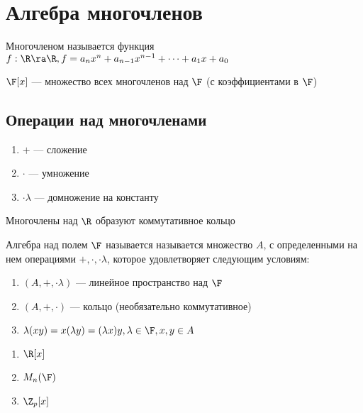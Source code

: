 
\section{Алгебра многочленов}

\begin{definition}
    Многочленом называется функция \(f: \R \ra \R, f = a_nx^n + a_{n-1}x^{n-1} + \dots + a_1x + a_0\)
\end{definition}

\begin{definition}
    \(\F[x]\) --- множество всех многочленов над \(\F\) (с коэффициентами в \(\F\))
\end{definition}

\subsection{Операции над многочленами}
\begin{enumerate}
    \item \(+\) --- сложение
    \item \(\cdot\) --- умножение
    \item \(\cdot\lambda\) --- домножение на константу
\end{enumerate}

\begin{note}
    Многочлены над \(\R\) образуют коммутативное кольцо
\end{note}

\begin{definition}
    Алгебра над полем \(\F\) называется называется множество \(A\), с определенными на нем операциями \(+, \cdot, \cdot \lambda\), которое удовлетворяет следующим условиям:
    \begin{enumerate}
        \item \((A, +, \cdot\lambda)\) --- линейное пространство над $\F$
        \item \((A, +, \cdot)\) --- кольцо (необязательно коммутативное)
        \item \(\lambda(xy) = x(\lambda y) = (\lambda x)y, \lambda \in \F, x, y \in A\)
    \end{enumerate}
\end{definition}

\begin{example}\indent
    \begin{enumerate}
        \item \(\R[x]\)
        \item \(M_n(\F)\)
        \item \(\Z_p[x]\)
    \end{enumerate}
\end{example}

